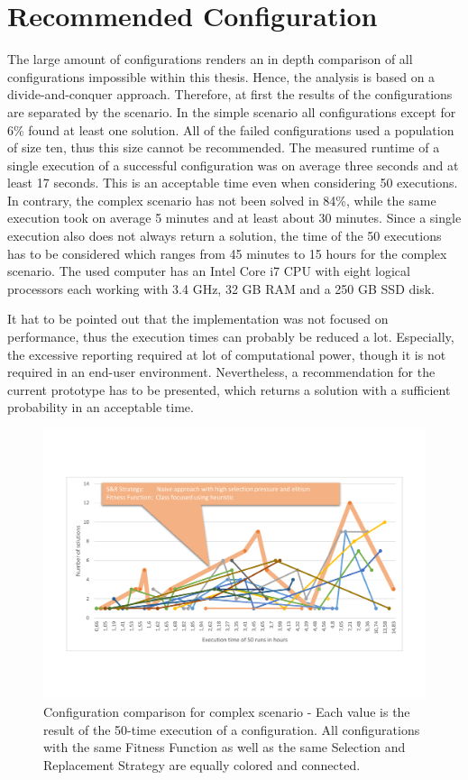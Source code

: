 \section{Recommended Configuration}
\label{secRecommendedConfiguration}

The large amount of configurations renders an in depth comparison of all configurations impossible within this thesis. Hence, the analysis is based on a divide-and-conquer approach. Therefore, at first the results of the configurations are separated by the scenario. In the simple scenario all configurations except for 6\% found at least one solution. All of the failed configurations used a population of size ten, thus this size cannot be recommended. The measured runtime of a single execution of a successful configuration was on average three seconds and at least 17 seconds. This is an acceptable time even when considering 50 executions. In contrary, the complex scenario has not been solved in 84\%, while the same execution took on average 5 minutes and at least about 30 minutes. Since a single execution also does not always return a solution, the time of the 50 executions has to be considered which ranges from 45 minutes to 15 hours for the complex scenario. The used computer has an Intel Core i7 CPU with eight logical processors each working with 3.4 GHz, 32 GB RAM and a 250 GB SSD disk.

It hat to be pointed out that the implementation was not focused on performance, thus the execution times can probably be reduced a lot. Especially, the excessive reporting required at lot of computational power, though it is not required in an end-user environment. Nevertheless, a recommendation for the current prototype has to be presented, which returns a solution with a sufficient probability in an acceptable time. 

\begin{figure}[!ht]
	\centering
	\includegraphics[scale=0.55, trim=1.5cm 3.5cm 1.5cm 3.5cm, clip=true]{Images/ConfigurationComparison3.pdf} 
	\caption{Configuration comparison for complex scenario - Each value is the result of the 50-time execution of a configuration. All configurations with the same Fitness Function as well as the same Selection and Replacement Strategy are equally colored and connected.}
	\label{figConfigurationComparison3}
\end{figure}

